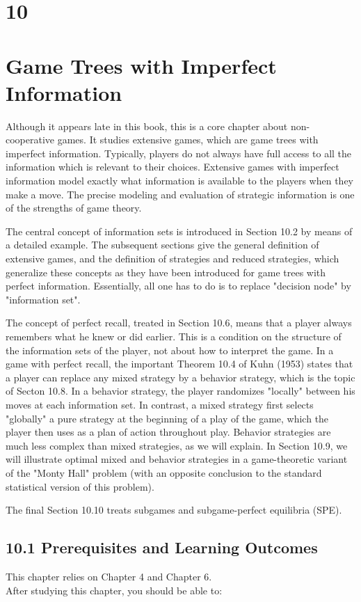 \documentclass[12pt]{article}
\begin{document}
\section*{10}
\section*{Game Trees with Imperfect Information}
Although it appears late in this book, this is a core chapter about non-cooperative games. It studies extensive games, which are game trees with imperfect information. Typically, players do not always have full access to all the information which is relevant to their choices. Extensive games with imperfect information model exactly what information is available to the players when they make a move. The precise modeling and evaluation of strategic information is one of the strengths of game theory.

The central concept of information sets is introduced in Section 10.2 by means of a detailed example. The subsequent sections give the general definition of extensive games, and the definition of strategies and reduced strategies, which generalize these concepts as they have been introduced for game trees with perfect information. Essentially, all one has to do is to replace "decision node" by "information set".

The concept of perfect recall, treated in Section 10.6, means that a player always remembers what he knew or did earlier. This is a condition on the structure of the information sets of the player, not about how to interpret the game. In a game with perfect recall, the important Theorem 10.4 of Kuhn (1953) states that a player can replace any mixed strategy by a behavior strategy, which is the topic of Secton 10.8. In a behavior strategy, the player randomizes "locally" between his moves at each information set. In contrast, a mixed strategy first selects "globally" a pure strategy at the beginning of a play of the game, which the player then uses as a plan of action throughout play. Behavior strategies are much less complex than mixed strategies, as we will explain. In Section 10.9, we will illustrate optimal mixed and behavior strategies in a game-theoretic variant of the "Monty Hall" problem (with an opposite conclusion to the standard statistical version of this problem).

The final Section 10.10 treats subgames and subgame-perfect equilibria (SPE).

\subsection*{10.1 Prerequisites and Learning Outcomes}
This chapter relies on Chapter 4 and Chapter 6.\\
After studying this chapter, you should be able to:
\end{document}
